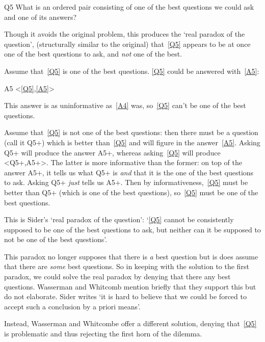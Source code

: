 	\begin{principle}{Q5}\label{Q5}
	What is an ordered pair consisting of one of the best questions we could ask and one of its answers?
	\end{principle}

Though it avoids the original problem, this produces the `real paradox of the question', (structurally similar to the original) that~\ref{Q5} appears to be at once one of the best questions to ask, and \emph{not} one of the best.

Assume that~\ref{Q5} is one of the best questions.
\ref{Q5} could be answered  with~\ref{A5}:
	
	\begin{principle}{A5}\label{A5}
	<\ref{Q5},\ref{A5}>
	\end{principle}

This answer is as uninformative as~\ref{A4} was, so~\ref{Q5} can't be one of the best questions.

Assume that~\ref{Q5} is not one of the best questions: then there must be a question (call it Q5+) which is better than~\ref{Q5} and will figure in the answer~\ref{A5}.
Asking Q5+ will produce the answer A5+, whereas asking~\ref{Q5} will produce <Q5+,A5+>.
The latter is more informative than the former: on top of the answer A5+, it tells us what Q5+ is \emph{and} that it is the one of the best questions to ask.
Asking Q5+ \emph{just} tells us A5+.
Then by informativeness,~\ref{Q5} must be better than Q5+ (which is one of the best questions), so~\ref{Q5} must be one of the best questions.

This is Sider's `real paradox of the question': `\ref{Q5} cannot be consistently supposed to be one of the best questions to ask, but neither can it be supposed to not be one of the best questions'.

This paradox no longer supposes that there is \emph{a} best question but is does assume that there are \emph{some} best questions.
So in keeping with the solution to the first paradox, we could solve the real paradox by denying that there any best questions.
Wasserman and Whitcomb mention briefly that they support this but do not elaborate. 
\parencite[151]{Wasserman_2011}
Sider writes `it is hard to believe that we could be forced to accept such a conclusion by a priori means'.
\parencite[4]{Sider1997}

Instead, Wasserman and Whitcombe offer a different solution, denying that~\ref{Q5} is problematic and thus rejecting the first horn of the dilemma.

